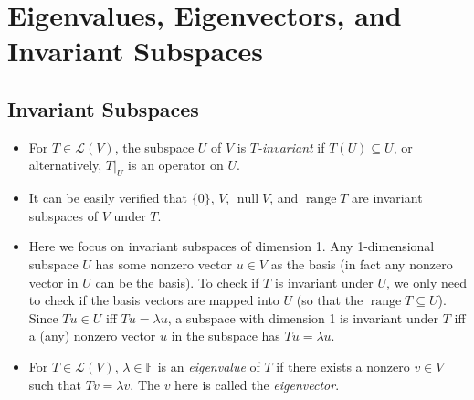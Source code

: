 \documentclass{article}
\newcommand{\F}{\mathbb{F}}
\newcommand{\n}{\operatorname{null}}
\renewcommand{\r}{\operatorname{range}}
\newcommand{\LV}{\mathcal{L}(V)}
\begin{document}
\section{Eigenvalues, Eigenvectors, and Invariant Subspaces}
\subsection{Invariant Subspaces}
\begin{itemize}
    \item For $T \in \LV$, the subspace $U$ of $V$ is \textit{$T$-invariant} if $T(U) \subseteq U$, or alternatively, $T|_U$ is an operator on $U$.
    \item It can be easily verified that $\{0\}$, $V$, $\n V$, and $\r T$ are invariant subspaces of $V$ under $T$.
    \item Here we focus on invariant subspaces of dimension 1. Any 1-dimensional subspace $U$ has some nonzero vector $u \in V$ as the basis (in fact any nonzero vector in $U$ can be the basis). To check if $T$ is invariant under $U$, we only need to check if the basis vectors are mapped into $U$ (so that the $\r T \subseteq U$). Since $Tu \in U$ iff $Tu = \lambda u$, a subspace with dimension 1 is invariant under $T$ iff a (any) nonzero vector $u$ in the subspace has $Tu = \lambda u$.
    \item For $T \in \LV$, $\lambda \in \F$ is an \textit{eigenvalue} of $T$ if there exists a nonzero $v \in V$ such that $Tv = \lambda v$. The $v$ here is called the \textit{eigenvector}.
    

\end{itemize}
\end{document}
